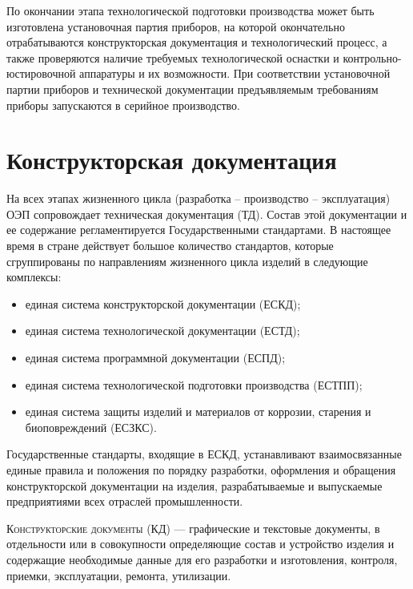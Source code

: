 По окончании этапа технологической подготовки производства может быть изготовлена установочная партия приборов, на которой окончательно отрабатываются конструкторская документация и технологический процесс, а также проверяются наличие требуемых технологической оснастки и контрольно-юстировочной аппаратуры и их возможности. При соответствии установочной партии приборов и технической документации предъявляемым требованиям приборы запускаются в серийное производство.

\section{Конструкторская документация}
На всех этапах жизненного цикла (разработка -- производство -- эксплуатация) ОЭП сопровождает техническая документация (ТД). Состав этой документации и ее содержание регламентируется Государственными стандартами. В настоящее время в стране действует большое количество стандартов, которые сгруппированы по направлениям жизненного цикла изделий в следующие комплексы:
\begin{itemize}
	\item единая система конструкторской документации (ЕСКД);
	\item единая система технологической документации (ЕСТД);
	\item единая система программной документации (ЕСПД);
	\item единая система технологической подготовки производства (ЕСТПП);
	\item единая система защиты изделий и материалов от коррозии, старения и биоповреждений (ЕСЗКС).
\end{itemize}

Государственные стандарты, входящие в ЕСКД, устанавливают взаимосвязанные единые правила и положения по порядку разработки, оформления и обращения конструкторской документации на изделия, разрабатываемые и выпускаемые предприятиями всех отраслей промышленности.

\textsc{Конструкторские документы (КД)} --- графические и текстовые документы, в отдельности или в совокупности определяющие состав и устройство изделия и содержащие необходимые данные для его разработки и изготовления, контроля, приемки, эксплуатации, ремонта, утилизации.


